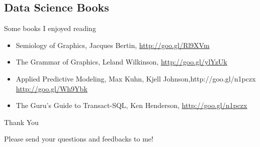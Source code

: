 \documentclass[10pt]{beamer}
\begin{document}
  \subsection{Data Science Books}

    \begin{frame}{Some books I enjoyed reading}
      \begin{itemize}
        \item Semiology of Graphics, Jacques Bertin, \url{http://goo.gl/Rl9XVm}
        \item The Grammar of Graphics, Leland Wilkinson, \url{http://goo.gl/ylYzUk}
        \item Applied Predictive Modeling, Max Kuhn, Kjell Johnson,http://goo.gl/n1pczx \url{http://goo.gl/Wh9Ybk}
        \item The Guru's Guide to Transact-SQL, Ken Henderson, \url{http://goo.gl/n1pczx}
      \end{itemize}
    \end{frame}

    \begin{frame}{Thank You}
      \centerline{\large Please send your questions and feedbacks to me!}
    \end{frame}
\end{document}
